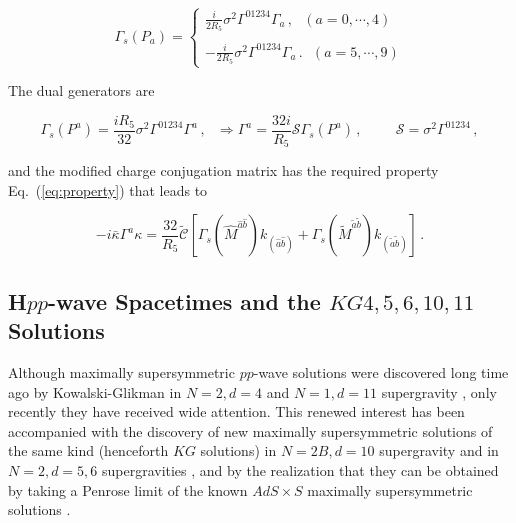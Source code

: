\documentclass[12pt,a4paper]{article}
\begin{document}
\begin{equation}
  \Gamma_{s}(P_{a})=\left\{
  \begin{array}{c}
  \frac{i}{2R_5}\sigma^{2}\Gamma^{01234}\Gamma_a\, , 
  \ \ \ (a=0,\cdots,4) \\ \\ 
  -\frac{i}{2R_5}\sigma^{2} \Gamma^{01234}\Gamma_a\, .
  \ \ \ (a=5,\cdots,9)
  \end{array} 
  \right. 
\end{equation}

The dual generators are 

\begin{equation}
\Gamma_{s}(P^{a}) = {\textstyle\frac{iR_{5}}{32}} \sigma^{2}
\Gamma^{01234}\Gamma^{a}\, ,
\,\,\,\,
\Rightarrow
\Gamma^{a} = {\textstyle\frac{32i}{R_{5}}} \mathcal{S}\Gamma_{s}(P^{a})\, ,
\hspace{1cm}
\mathcal{S}=\sigma^{2}\Gamma^{01234}\, , 
\end{equation}

\noindent
and the modified charge conjugation matrix has the required property
Eq.~(\ref{eq:property}) that leads to

\begin{equation}
-i\bar{\kappa}\Gamma^{a}\kappa = {\textstyle\frac{32}{R_{5}}} 
\tilde{\mathcal{C}}[\Gamma_{s}(\hat{M}^{\hat{a}\hat{b}})k_{(\hat{a}\hat{b})}
+\Gamma_{s}(\tilde{M}^{\tilde{a}\tilde{b}})
k_{(\tilde{a}\tilde{b})}]\, .
\end{equation}


\subsection{H$pp$-wave Spacetimes and the $KG4,5,6,10,11$ Solutions}
\label{sec-HppKG}

Although maximally supersymmetric $pp$-wave solutions were discovered
long time ago by Kowalski-Glikman in $N=2,d=4$ and $N=1,d=11$
supergravity \cite{Kowalski-Glikman:wv,Kowalski-Glikman:1985im}, only
recently they have received wide attention. This renewed interest has
been accompanied with the discovery of new maximally supersymmetric
solutions of the same kind (henceforth $KG$ solutions) in $N=2B,d=10$
supergravity \cite{Blau:2001ne} and in $N=2,d=5,6$ supergravities
\cite{Meessen:2001vx}, and by the realization that they can be
obtained by taking a Penrose limit \cite{kn:Pen6,Gueven:2000ru} of the
known $AdS\times S$ maximally supersymmetric solutions
\cite{Blau:2002dy,Blau:2002rg}.
\end{document}
